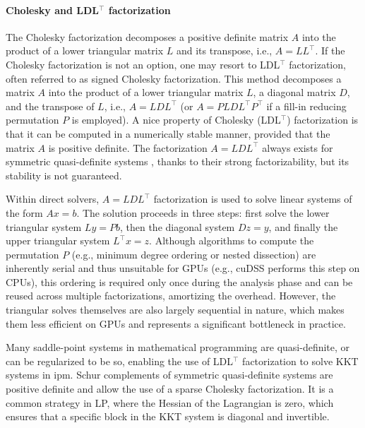 \documentclass{article}
\begin{document}
\paragraph{Cholesky and LDL$^\top$ factorization}
The Cholesky factorization decomposes a positive definite matrix $A$ into the product of a lower triangular matrix $L$ and its transpose, i.e., $A = LL^\top$. 
If the Cholesky factorization is not an option, one may resort to LDL$^\top$ factorization, often referred to as signed Cholesky factorization.
This method decomposes a matrix $A$ into the product of a lower triangular matrix $L$, a diagonal matrix $D$, and the transpose of $L$, i.e., $A = L D L^\top$ (or $A = P L D L^\top P^\top$ if a fill-in reducing permutation $P$ is employed).
A nice property of Cholesky (LDL$^\top$) factorization is that it can be computed in a numerically stable manner, provided that the matrix $A$ is positive definite.
The factorization $A = L D L^\top$ always exists for symmetric quasi-definite systems \cite{}, thanks to their strong factorizability, but its stability is not guaranteed.


Within direct solvers, $A = L D L^\top$ factorization is used to solve linear systems of the form $Ax = b$. The solution proceeds in three steps: first solve the lower triangular system $Ly = Pb$, then the diagonal system $Dz = y$, and finally the upper triangular system $L^\top x = z$.
Although algorithms to compute the permutation $P$ (e.g., minimum degree ordering or nested dissection) are inherently serial and thus unsuitable for GPUs (e.g., cuDSS performs this step on CPUs), this ordering is required only once during the analysis phase and can be reused across multiple factorizations, amortizing the overhead.
However, the triangular solves themselves are also largely sequential in nature, which makes them less efficient on GPUs and represents a significant bottleneck in practice.

Many saddle-point systems in mathematical programming are quasi-definite, or can be regularized to be so, enabling the use of LDL$^\top$ factorization to solve KKT systems in \gls*{ipm}.
Schur complements of symmetric quasi-definite systems are positive definite and allow the use of a sparse Cholesky factorization.
It is a common strategy in LP, where the Hessian of the Lagrangian is zero, which ensures that a specific block in the KKT system is diagonal and invertible.
\end{document}
